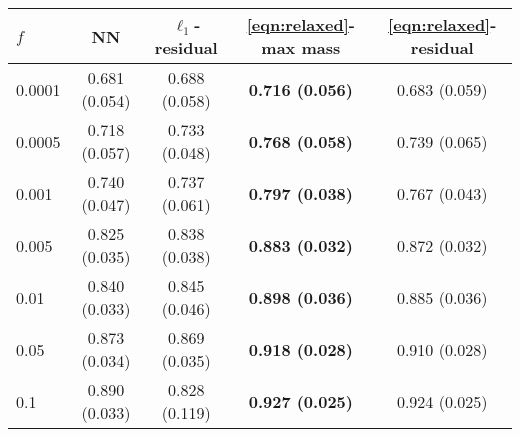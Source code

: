 \begin{tabular}{|l||c|c|c|c|}
\hline
$f$ & NN & $\ell_1$-residual & \eqref{eqn:relaxed}-max mass & \eqref{eqn:relaxed}-residual \\
\hline\hline
0.0001 & 0.681 (0.054) & 0.688 (0.058) & \textbf{0.716 (0.056)} & 0.683 (0.059) \\
\hline
0.0005 & 0.718 (0.057) & 0.733 (0.048) & \textbf{0.768 (0.058)} & 0.739 (0.065) \\
\hline
0.001 & 0.740 (0.047) & 0.737 (0.061) & \textbf{0.797 (0.038)} & 0.767 (0.043) \\
\hline
0.005 & 0.825 (0.035) & 0.838 (0.038) & \textbf{0.883 (0.032)} & 0.872 (0.032) \\
\hline
0.01 & 0.840 (0.033) & 0.845 (0.046) & \textbf{0.898 (0.036)} & 0.885 (0.036) \\
\hline
0.05 & 0.873 (0.034) & 0.869 (0.035) & \textbf{0.918 (0.028)} & 0.910 (0.028) \\
\hline
0.1 & 0.890 (0.033) & 0.828 (0.119) & \textbf{0.927 (0.025)} & 0.924 (0.025) \\
\hline
\end{tabular}